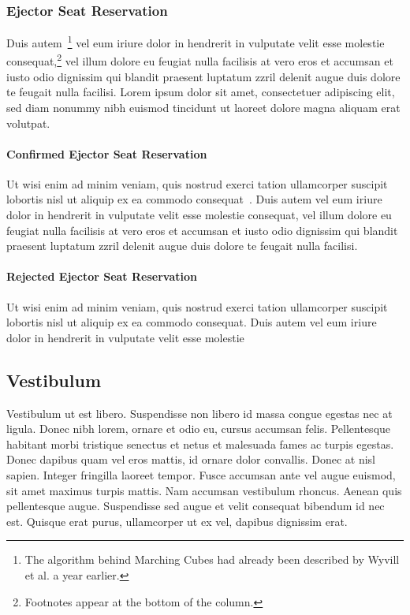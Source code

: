 \documentclass[journal]{vgtc}                %
\begin{document}
\subsubsection{Ejector Seat Reservation}

Duis autem~\cite{Lorensen:1987:MCA}\footnote{The algorithm behind
Marching Cubes \cite{Lorensen:1987:MCA} had already been
described by Wyvill et al. \cite{Wyvill:1986:DSS} a year
earlier.} vel eum iriure dolor in hendrerit
in vulputate velit esse molestie consequat,\footnote{Footnotes
appear at the bottom of the column.} vel illum dolore eu
feugiat nulla facilisis at vero eros et accumsan et iusto odio
dignissim qui blandit praesent luptatum zzril delenit augue duis
dolore te feugait nulla facilisi. Lorem ipsum dolor sit amet,
consectetuer adipiscing elit, sed diam nonummy nibh euismod tincidunt
ut laoreet dolore magna aliquam erat volutpat.


\paragraph{Confirmed Ejector Seat Reservation}

Ut wisi enim ad minim veniam, quis nostrud exerci tation ullamcorper
suscipit lobortis nisl ut aliquip ex ea commodo
consequat~\cite{Nielson:1991:TAD}. Duis autem vel eum iriure dolor in
hendrerit in vulputate velit esse molestie consequat, vel illum dolore
eu feugiat nulla facilisis at vero eros et accumsan et iusto odio
dignissim qui blandit praesent luptatum zzril delenit augue duis
dolore te feugait nulla facilisi.

\paragraph{Rejected Ejector Seat Reservation}

Ut wisi enim ad minim veniam, quis nostrud exerci tation ullamcorper
suscipit lobortis nisl ut aliquip ex ea commodo consequat. Duis autem
vel eum iriure dolor in hendrerit in vulputate velit esse molestie

\subsection{Vestibulum}

Vestibulum ut est libero. Suspendisse non libero id massa congue egestas nec at ligula. Donec nibh lorem, ornare et odio eu, cursus accumsan felis. Pellentesque habitant morbi tristique senectus et netus et malesuada fames ac turpis egestas. Donec dapibus quam vel eros mattis, id ornare dolor convallis. Donec at nisl sapien. Integer fringilla laoreet tempor. Fusce accumsan ante vel augue euismod, sit amet maximus turpis mattis. Nam accumsan vestibulum rhoncus. Aenean quis pellentesque augue. Suspendisse sed augue et velit consequat bibendum id nec est. Quisque erat purus, ullamcorper ut ex vel, dapibus dignissim erat.
\end{document}
